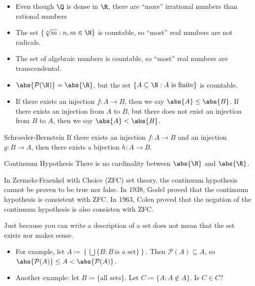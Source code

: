 \begin{itemize}
    \item Even though $\Q$ is dense in $\R$, there are ``more'' irrational numbers than rational numbers
    \item The set $\{\sqrt[n]{m} : n,m \in \N\}$ is countable, so ``most'' real numbers are not radicals.
    \item The set of algebraic numbers is countable, so ``most'' real numbers are transcendental.
    \item $\abs{\mathcal{P}(\N)} = \abs{\R}$, but the set $\{ A \subseteq \N : A\ \text{is finite} \}$ is countable.
    \item If there exists an injection $f : A \to B$, then we say $\abs{A} \leq \abs{B}$. If there exists an injection from $A$ to $B$, but there does not exist an injection from $B$ to $A$, then we say $\abs{A} < \abs{B}$.
\end{itemize}

\begin{thmbox}{Schroeder-Bernstein}{}
    If there exists an injection $f : A \to B$ and an injection $g : B \to A$, then there exists a bijection $h : A \to B$.
\end{thmbox}

\begin{thmbox}{Continuum Hypothesis}{}
    There is no cardinality between $\abs{\N}$ and $\abs{\R}$.
\end{thmbox}

In Zermelo-Fraenkel with Choice (ZFC) set theory, the continuum hypothesis cannot be proven to be true nor false. In 1938, Godel proved that the continuum hypothesis is consistent with ZFC. In 1963, Colen proved that the negation of the continuum hypothesis is also consisten with ZFC.

\begin{notebox}
    Just because you can write a description of a set does not mean that the set exists nor makes sense.
    \begin{itemize}
        \item For example, let $A \coloneq \left\{ \bigcup \{ B : B\ \text{is a set} \} \right\}$. Then $\mathcal{P}(A) \subseteq A$, so $\abs{\mathcal{P}(A)} \leq A < \abs{\mathcal{P}(A)}$.
        \item Another example: let $B \coloneq \{\text{all sets}\}$. Let $C \coloneq \{ A : A \notin A \}$. Is $C \in C$?
    \end{itemize}
\end{notebox}
